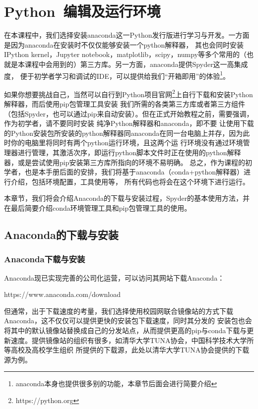 \chapter{Python~编辑及运行环境}
在本课程中，我们选择安装anaconda这一Python发行版进行学习与开发。一方面是因为anaconda在安装时不仅仅能够安装一个python解释器，
其也会同时安装IPython kernel，Jupyter notebook，matplotlib，scipy，numpy等多个常用的（也就是本课程中会用到的）第三方库。另一方面，anaconda提供Spyder这一高集成度，
便于初学者学习和调试的IDE，可以提供给我们“开箱即用”的体验\footnote{anaconda本身也提供很多别的功能，本章节后面会进行简要介绍}。

如果你想要挑战自己，当然可以自行到Python项目官网\footnote{https://python.org}上自行下载和安装Python解释器，而后使用pip包管理工具安装
我们所需的各类第三方库或者第三方组件（包括Spyder，也可以通过pip来自动安装）。但在正式开始教程之前，需要强调，作为初学者，请不要同时安装
纯净Python解释器和anaconda，即不要
让使用下载的Python安装包所安装的python解释器同anaconda在同一台电脑上并存，因为此时你的电脑里将同时有两个python运行环境，且这两个运
行环境没有通过环境管理器进行管理，其激活次序，即运行python脚本文件时正在使用的python解释器，或是尝试使用pip安装第三方库所指向的环境不易明确。
总之，作为课程的初学者，也是本手册后面的安排，我们将基于anaconda（conda+python解释器）进行介绍，包括环境配置，工具使用等，
所有代码也将会在这个环境下进行运行。

本章节，我们将会介绍Anaconda的下载与安装过程，Spyder的基本使用方法，并在最后简要介绍conda环境管理工具和pip包管理工具的使用。
\section{Anaconda的下载与安装}
\subsection{Anaconda下载与安装}
Anaconda现已实现完善的公司化运营，可以访问其网站下载Anaconda：

https://www.anaconda.com/download

但通常，出于下载速度的考量，我们选择使用校园网联合镜像站的方式下载Anaconda，这不仅仅可以提供更快的安装包下载速度，同时其分发的
安装包也会将其中的默认镜像站替换成自己的分发站点，从而提供更高的pip与conda下载与更新速度。提供镜像站的组织有很多，如清华大学TUNA协会，中国科学技术大学所等高校及高校学生组织
所提供的下载源，此处以清华大学TUNA协会提供的下载源为例。

